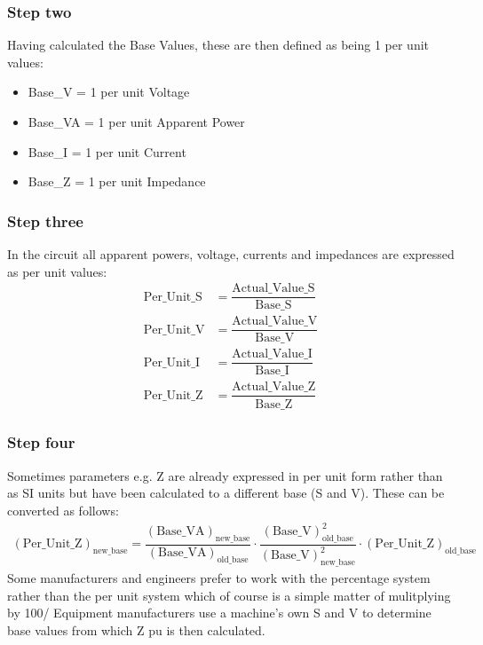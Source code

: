 \documentclass[class=report, crop=false, 12pt,a4paper]{standalone}
\begin{document}
\subsubsection{Step two}
Having calculated the Base Values, these are then defined as being 1 per unit values:
\begin{itemize}
	\item Base\_V = 1 per unit Voltage
	\item Base\_VA = 1 per unit Apparent Power
	\item Base\_I = 1 per unit Current
	\item Base\_Z = 1 per unit Impedance
\end{itemize}
\subsubsection{Step three}
In the circuit all apparent powers, voltage, currents and impedances are expressed as per unit values:
\begin{align}
	\textrm{Per\_Unit\_S} &= \dfrac{\textrm{Actual\_Value\_S}}{\textrm{Base\_S}}\\
	\textrm{Per\_Unit\_V} &= \dfrac{\textrm{Actual\_Value\_V}}{\textrm{Base\_V}}\\
	\textrm{Per\_Unit\_I} &= \dfrac{\textrm{Actual\_Value\_I}}{\textrm{Base\_I}}\\
	\textrm{Per\_Unit\_Z} &= \dfrac{\textrm{Actual\_Value\_Z}}{\textrm{Base\_Z}}
\end{align}
\subsubsection{Step four}
Sometimes parameters e.g. Z are already expressed in per unit form rather than as SI units but have been calculated to a different base (S and V). These can be converted as follows:
\begin{gather}
	\left(\textrm{Per\_Unit\_Z}\right)_{\textrm{new\_base}} = \dfrac{\left(\textrm{Base\_VA}\right)_{\textrm{new\_base}}}{\left(\textrm{Base\_VA}\right)_{\textrm{old\_base}}} \cdot \dfrac{\left(\textrm{Base\_V}\right)^2_{\textrm{old\_base}}}{\left(\textrm{Base\_V}\right)^2_{\textrm{new\_base}}} \cdot \left(\textrm{Per\_Unit\_Z}\right)_{\textrm{old\_base}}
\end{gather}
Some manufacturers and engineers prefer to work with the percentage system rather than the per unit system which of course is a simple matter of mulitplying by 100/ Equipment manufacturers use a machine's own S and V to determine base values from which Z pu is then calculated.
\end{document}
